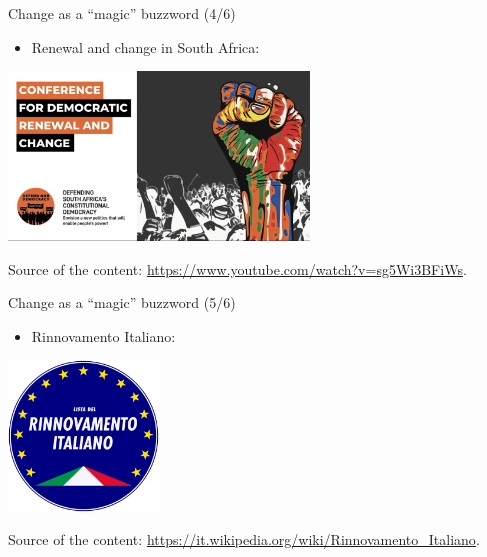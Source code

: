 \documentclass{beamer}
\begin{document}
\begin{frame}
{\centerline{Change as a ``magic'' buzzword (4/6)}}
 
\begin{itemize}
 \item Renewal and change in South Africa:
 \end{itemize} 
\begin{center}
 \includegraphics[width=8cm]{P2023.AIBCCSS.Change/SouthAfrica.Change.jpg}
 
 \end{center}
 
\begin{center}
\tiny
Source of the content: \url{https://www.youtube.com/watch?v=sg5Wi3BFiWs}.
\end{center}



\end{frame}

\begin{frame}
{\centerline{Change as a ``magic'' buzzword (5/6)}}
 
\begin{itemize}
 \item Rinnovamento Italiano:
 \end{itemize} 
\begin{center}
\includegraphics[width=4cm]{P2023.AIBCCSS.Change/RinnovamentoItaliano.png}
 
 \end{center}
 
\begin{center}
\tiny
Source of the content: \url{https://it.wikipedia.org/wiki/Rinnovamento_Italiano}.
\end{center}



\end{frame}	
\end{document}
